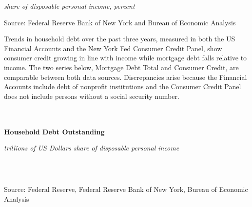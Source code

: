 \documentclass{report}
\begin{document}
{{{\begin{minipage}{0.76\textwidth}
\footnotesize{\textit{share of disposable personal income, percent}} \\



\vspace{1mm}

\footnotesize{Source: Federal Reserve Bank of New York and Bureau of Economic Analysis}


\end{minipage}

\newpage


\begin{minipage}{0.76\textwidth}

\small Trends in household debt over the past three years, measured in both the US Financial Accounts and the New York Fed Consumer Credit Panel, show consumer credit growing in line with income while mortgage debt falls relative to income. The two series below, Mortgage Debt Total and Consumer Credit, are comparable between both data sources. Discrepancies arise because the Financial Accounts include debt of nonprofit institutions and the Consumer Credit Panel does not include persons without a social security number.\\

 \\

 \\

\vspace{4mm}

\noindent \normalsize \textbf{Household Debt Outstanding}\\
\footnotesize{\textit{trillions of US Dollars \hspace{46mm} share of disposable personal income}\\ \vspace{4mm}
\noindent {} \setlength{\tabcolsep}{3.1pt} \color{black!90}
		{\renewcommand{\arraystretch}{1.55}
		 \begin{tabular}{p{36mm} R{11.8mm} R{11.8mm}  R{8.0mm} R{7.4mm} R{7.4mm} 
		   R{7.4mm} R{7.4mm}}
			 
			 \hline
		\end{tabular}
		}	\\}
		
\vspace{-2mm}
\footnotesize{Source: Federal Reserve, Federal Reserve Bank of New York, Bureau of Economic Analysis}


\end{minipage}}}}
\end{document}
